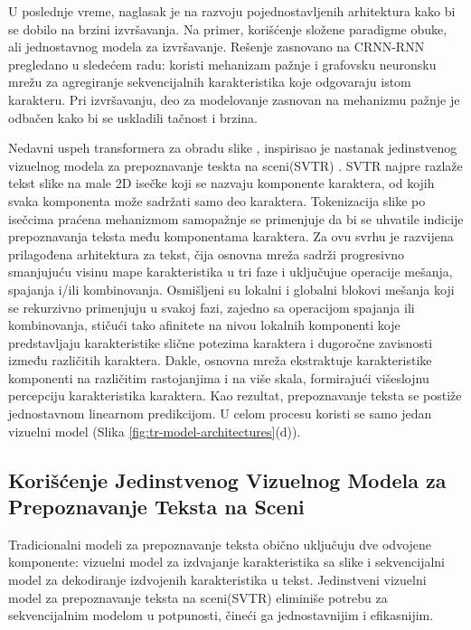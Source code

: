 \documentclass[a4paper,12pt]{article}
\begin{document}
	U poslednje vreme, naglasak je na razvoju pojednostavljenih arhitektura kako bi se dobilo na brzini izvršavanja. Na primer, korišćenje složene paradigme obuke, ali jednostavnog modela za izvršavanje. Rešenje zasnovano na CRNN-RNN pregledano u sledećem radu: \cite{Hu_Cai_Hou_Yi_Lin_2020} koristi mehanizam pažnje i grafovsku neuronsku mrežu za agregiranje sekvencijalnih karakteristika koje odgovaraju istom karakteru. Pri izvršavanju, deo za modelovanje zasnovan na mehanizmu pažnje je odbačen kako bi se uskladili tačnost i brzina.
	
	Nedavni uspeh transformera za obradu slike \cite{dosovitskiy2021imageworth16x16words, liu2021swintransformerhierarchicalvision}, inspirisao je nastanak jedinstvenog vizuelnog modela za prepoznavanje teskta na sceni(SVTR) \cite{du2022svtrscenetextrecognition}. SVTR najpre razlaže tekst slike na male 2D isečke koji se nazvaju komponente karaktera, od kojih svaka komponenta može sadržati samo deo karaktera. Tokenizacija slike po isečcima praćena mehanizmom samopažnje se primenjuje da bi se uhvatile indicije prepoznavanja teksta među komponentama karaktera. Za ovu svrhu je razvijena prilagođena arhitektura za tekst, čija osnovna mreža sadrži progresivno smanjujuću visinu mape karakteristika u tri faze i uključujue operacije mešanja, spajanja i/ili kombinovanja. Osmišljeni su lokalni i globalni blokovi mešanja koji se rekurzivno primenjuju u svakoj fazi, zajedno sa operacijom spajanja ili kombinovanja, stičući tako afinitete na nivou lokalnih komponenti koje predstavljaju karakteristike slične potezima karaktera i dugoročne zavisnosti između različitih karaktera. Dakle, osnovna mreža ekstraktuje karakteristike komponenti na različitim rastojanjima i na više skala, formirajući višeslojnu percepciju karakteristika karaktera. Kao rezultat, prepoznavanje teksta se postiže jednostavnom linearnom predikcijom. U celom procesu koristi se samo jedan vizuelni model (Slika \ref{fig:tr-model-architectures}(d)).

	\subsection{Korišćenje Jedinstvenog Vizuelnog Modela za Prepoznavanje Teksta na Sceni}
	
	Tradicionalni modeli za prepoznavanje teksta obično uključuju dve odvojene komponente: vizuelni model za izdvajanje karakteristika sa slike i sekvencijalni model za dekodiranje izdvojenih karakteristika u tekst. Jedinstveni vizuelni model za prepoznavanje teksta na sceni(SVTR) eliminiše potrebu za sekvencijalnim modelom u potpunosti, čineći ga jednostavnijim i efikasnijim.
	
\end{document}
